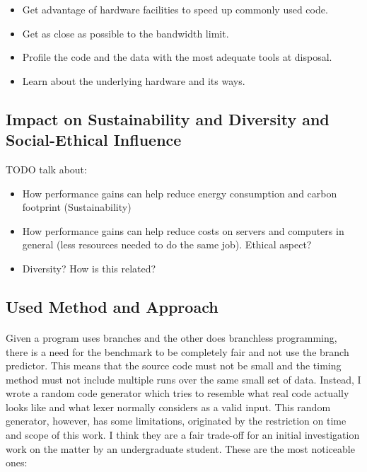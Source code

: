 \documentclass[12pt]{article}
\begin{document}
	\begin{itemize}
		\item Get advantage of hardware facilities to speed up commonly used code.
		\item Get as close as possible to the bandwidth limit.
		\item Profile the code and the data with the most adequate tools at disposal.
		\item Learn about the underlying hardware and its ways.
	\end{itemize}

	\subsection{Impact on Sustainability and Diversity and Social-Ethical Influence}
		TODO talk about:
		\begin{itemize}
			\item How performance gains can help reduce energy consumption and carbon footprint (Sustainability)
			\item How performance gains can help reduce costs on servers and computers in general (less resources needed to do the same job). Ethical aspect?
			\item Diversity? How is this related?
		\end{itemize}
	\subsection{Used Method and Approach}
	
	\paragraph{}
	Given a program uses branches and the other does branchless programming, there is a need for the benchmark to be completely fair and not use the branch predictor. This means that the source code must not be small and the timing method must not include multiple runs over the same small set of data. Instead, I wrote a random code generator which tries to resemble what real code actually looks like and what lexer normally considers as a valid input. This random generator, however, has some limitations, originated by the restriction on time and scope of this work. I think they are a fair trade-off for an initial investigation work on the matter by an undergraduate student. These are the most noticeable ones:
	
\end{document}
